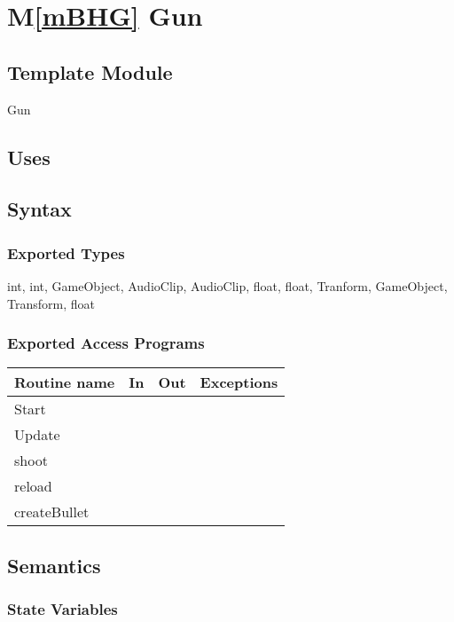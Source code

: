 \documentclass[12pt]{article}
\newcommand{\mref}[1]{M\ref{#1}}
\begin{document}
\newpage
\section*{\mref{mBHG} Gun}

\subsection*{Template Module}

Gun

\subsection* {Uses}


\subsection* {Syntax}

\subsubsection* {Exported Types}

int, int, GameObject, AudioClip, AudioClip, float, float, Tranform, GameObject, Transform, float

\subsubsection* {Exported Access Programs}

\begin{tabular}{| l | l | l | l |}
	\hline
	\textbf{Routine name} & \textbf{In} & \textbf{Out} & \textbf{Exceptions}\\
	\hline
	Start & ~ & ~  & ~\\
	Update & ~ & ~  & ~\\
	shoot & ~ & ~  & ~\\
	reload & ~ & ~ & ~\\
	createBullet & ~ & ~ & ~\\
	\hline
\end{tabular}

\subsection* {Semantics}

\subsubsection* {State Variables}
\end{document}
